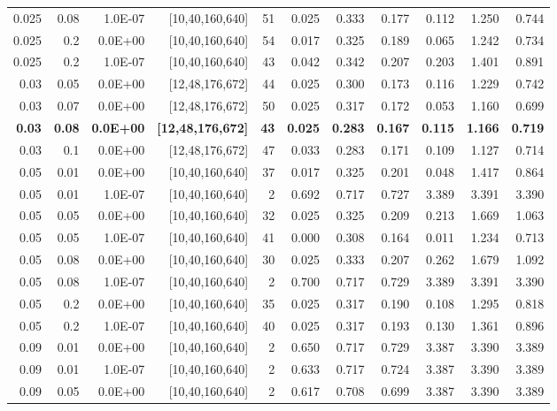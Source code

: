 \begin{table}[f]
\begin{tabular}{@{}rrrrrrrrrrr@{}}
0.025 & 0.08 & 1.0E-07 & {[}10,40,160,640{]} & 51 & 0.025 & 0.333 & 0.177 & 0.112 & 1.250 & 0.744 \\
0.025 & 0.2 & 0.0E+00 & {[}10,40,160,640{]} & 54 & 0.017 & 0.325 & 0.189 & 0.065 & 1.242 & 0.734 \\
0.025 & 0.2 & 1.0E-07 & {[}10,40,160,640{]} & 43 & 0.042 & 0.342 & 0.207 & 0.203 & 1.401 & 0.891 \\
0.03 & 0.05 & 0.0E+00 & {[}12,48,176,672{]} & 44 & 0.025 & 0.300 & 0.173 & 0.116 & 1.229 & 0.742 \\
0.03 & 0.07 & 0.0E+00 & {[}12,48,176,672{]} & 50 & 0.025 & 0.317 & 0.172 & 0.053 & 1.160 & 0.699 \\
\textbf{0.03} & \textbf{0.08} & \textbf{0.0E+00} & \textbf{{[}12,48,176,672{]}} & \textbf{43} & \textbf{0.025} & \textbf{0.283} & \textbf{0.167} & \textbf{0.115} & \textbf{1.166} & \textbf{0.719} \\
0.03 & 0.1 & 0.0E+00 & {[}12,48,176,672{]} & 47 & 0.033 & 0.283 & 0.171 & 0.109 & 1.127 & 0.714 \\
0.05 & 0.01 & 0.0E+00 & {[}10,40,160,640{]} & 37 & 0.017 & 0.325 & 0.201 & 0.048 & 1.417 & 0.864 \\
0.05 & 0.01 & 1.0E-07 & {[}10,40,160,640{]} & 2 & 0.692 & 0.717 & 0.727 & 3.389 & 3.391 & 3.390 \\
0.05 & 0.05 & 0.0E+00 & {[}10,40,160,640{]} & 32 & 0.025 & 0.325 & 0.209 & 0.213 & 1.669 & 1.063 \\
0.05 & 0.05 & 1.0E-07 & {[}10,40,160,640{]} & 41 & 0.000 & 0.308 & 0.164 & 0.011 & 1.234 & 0.713 \\
0.05 & 0.08 & 0.0E+00 & {[}10,40,160,640{]} & 30 & 0.025 & 0.333 & 0.207 & 0.262 & 1.679 & 1.092 \\
0.05 & 0.08 & 1.0E-07 & {[}10,40,160,640{]} & 2 & 0.700 & 0.717 & 0.729 & 3.389 & 3.391 & 3.390 \\
0.05 & 0.2 & 0.0E+00 & {[}10,40,160,640{]} & 35 & 0.025 & 0.317 & 0.190 & 0.108 & 1.295 & 0.818 \\
0.05 & 0.2 & 1.0E-07 & {[}10,40,160,640{]} & 40 & 0.025 & 0.317 & 0.193 & 0.130 & 1.361 & 0.896 \\
0.09 & 0.01 & 0.0E+00 & {[}10,40,160,640{]} & 2 & 0.650 & 0.717 & 0.729 & 3.387 & 3.390 & 3.389 \\
0.09 & 0.01 & 1.0E-07 & {[}10,40,160,640{]} & 2 & 0.633 & 0.717 & 0.724 & 3.387 & 3.390 & 3.389 \\
0.09 & 0.05 & 0.0E+00 & {[}10,40,160,640{]} & 2 & 0.617 & 0.708 & 0.699 & 3.387 & 3.390 & 3.389 \\

\end{tabular}
\end{table}
